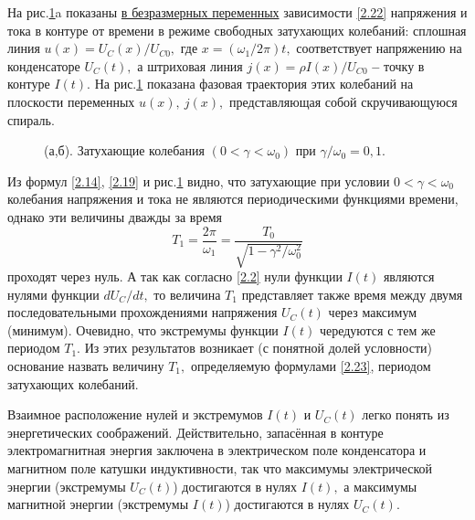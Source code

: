 На рис.\ref{fig2}a показаны \underline{в безразмерных переменных} зависимости \eqref{2.22} напряжения и тока в контуре от времени в режиме свободных затухающих колебаний: сплошная линия $u(x)=U_C(x)/U_{C0},$ где $x=(\omega_1/2\pi)t,$ соответствует напряжению на конденсаторе $U_C(t),$ а штриховая линия $j(x)=\rho I(x)/U_{C0}$ \textbf{--} точку в контуре $I(t).$ На рис.\ref{fig2} показана фазовая тра\-ектория этих колебаний на плоскости переменных   $u(x),~j(x),$ представляющая собой скручи\-вающуюся спираль.

\begin{figure}[h]
	\begin{minipage}[h]{0.5\linewidth}
	\end{minipage}
	\hfill
	\begin{minipage}[h]{0.5\linewidth}
	\end{minipage}
	\caption{(а,б). Затухающие колебания $(0<\gamma<\omega_0)$ при $\gamma/\omega_0=0,1$.}
	\label{fig2}
\end{figure}

Из формул \eqref{2.14}, \eqref{2.19} и рис.\ref{fig2} видно, что затухающие при условии $0<\gamma<\omega_0$ колебания напряжения и тока не являются периодическими функциями времени, однако эти величины дважды за время
\begin{equation}\label{2.23}
T_1=\dfrac{2\pi}{\omega_1}=\dfrac{T_0}{\sqrt{1-\gamma^2/\omega_0^2}}
\end{equation}
проходят через нуль. А так как согласно \eqref{2.2} нули функции $I(t)$ являются нулями функции $dU_C/dt,$ то величина $T_1$ представляет также время между двумя последовательными прохож\-дениями напряжения $U_C(t)$ через максимум (минимум). Очевидно, что экстремумы функции $I(t)$ чередуются с тем же периодом $T_1.$ Из этих результатов возникает (с понятной долей ус\-ловности) основание назвать  величину $T_1,$ определяемую формулами \eqref{2.23}, \textsf{периодом зату\-хающих колебаний.}

Взаимное расположение нулей и экстремумов $I(t)$ и $U_C(t)$ легко понять из энергетических соображений. Действительно, запасённая в контуре электромагнитная энергия заключена в электрическом поле конденсатора и магнитном поле катушки индуктивности, так что максимумы электрической энергии (экстремумы $U_C(t)$) достигаются в нулях $I(t),$ а максимумы магнитной энергии (экстремумы $I(t)$) достигаются в нулях $U_C(t).$


